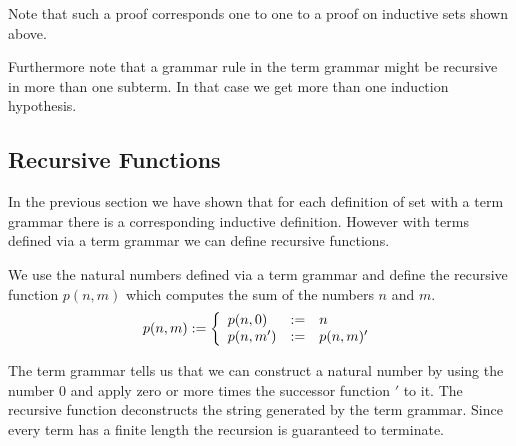 Note that such a proof corresponds one to one to a proof on inductive sets shown
above.

Furthermore note that a grammar rule in the term grammar might be recursive in
more than one subterm. In that case we get more than one induction hypothesis.




\subsection{Recursive Functions}

In the previous section we have shown that for each definition of set  with a
term grammar there is a corresponding inductive definition. However with terms
defined via a term grammar we can define recursive functions.

We use the natural numbers defined via a term grammar and define the recursive
function $p(n,m)$ which computes the sum of the numbers $n$ and $m$.
$$
p(n,m) := \left\{ \begin{array}{llll} 
    p(n,0)  &:=& n
    \\
    p(n,m') &:=& p(n,m)'
 \end{array} \right.
$$

The term grammar tells us that we can construct a natural number by using the
number $0$ and apply zero or more times the successor function $'$ to it. The
recursive function deconstructs the string generated by the term grammar. Since
every term has a finite length the recursion is guaranteed to terminate.
